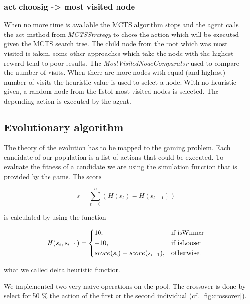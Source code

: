 \subsubsection{act choosig -> most visited node}

When no more time is available the \ac{MCTS} algorithm stops and the agent calls the act method from \textit{MCTSStrategy} to chose the action which will be executed given the \ac{MCTS} search tree. The child node from the root which was most visited is taken, some other approaches which take the node with the highest reward tend to poor results. The \textit{MostVisitedNodeComparator} used to compare the number of visits. When there are more nodes with equal (and highest) number of visits the heuristic value is used to select a node. With no heuristic given, a random node from the listof most visited nodes is selected. The depending action is executed by the agent. 

\subsection{Evolutionary algorithm} 

The theory of the evolution has to be mapped to the gaming problem. Each candidate of our population is
a list of actions that could be executed. To evaluate the fitness of a candidate we are using the
simulation function that is provided by the game. 
The score

\begin{equation}
s = \sum_{t=0}^n (H(s_t) - H(s_{t-1}))
\end{equation}

is calculated by using the function

\begin{equation}
    H(s_i, s_{i-1}) = 
\begin{dcases}
    10, & \text{if isWinner}  \\
    -10, & \text{if isLooser}  \\
    score(s_i) - score(s_{i-1}), & \text{otherwise.}
\end{dcases}
\end{equation}

what we called delta heuristic function.

We implemented two very naive operations on the pool. The crossover is done by
select for 50 \% the action of the first or the second individual (cf.~\cref{fig:crossover}).

